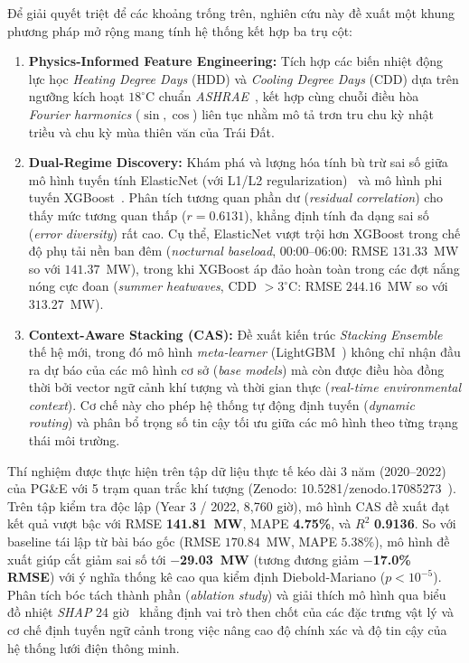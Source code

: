 Để giải quyết triệt để các khoảng trống trên, nghiên cứu này đề xuất một khung phương pháp mở rộng mang tính hệ thống kết hợp ba trụ cột:
\begin{enumerate}
    \item \textbf{Physics-Informed Feature Engineering:} Tích hợp các biến nhiệt động lực học \textit{Heating Degree Days} (HDD) và \textit{Cooling Degree Days} (CDD) dựa trên ngưỡng kích hoạt $18^\circ\text{C}$ chuẩn \textit{ASHRAE}~\cite{ashrae2021fundamentals}, kết hợp cùng chuỗi điều hòa \textit{Fourier harmonics} ($\sin, \cos$) liên tục nhằm mô tả trơn tru chu kỳ nhật triều và chu kỳ mùa thiên văn của Trái Đất.
    \item \textbf{Dual-Regime Discovery:} Khám phá và lượng hóa tính bù trừ sai số giữa mô hình tuyến tính ElasticNet (với L1/L2 regularization)~\cite{zou2005regularization} và mô hình phi tuyến XGBoost~\cite{chen2016xgboost}. Phân tích tương quan phần dư (\textit{residual correlation}) cho thấy mức tương quan thấp ($r = 0.6131$), khẳng định tính đa dạng sai số (\textit{error diversity}) rất cao. Cụ thể, ElasticNet vượt trội hơn XGBoost trong chế độ phụ tải nền ban đêm (\textit{nocturnal baseload}, 00:00--06:00: RMSE $131.33$~MW so với $141.37$~MW), trong khi XGBoost áp đảo hoàn toàn trong các đợt nắng nóng cực đoan (\textit{summer heatwaves}, CDD $> 3^\circ\text{C}$: RMSE $244.16$~MW so với $313.27$~MW).
    \item \textbf{Context-Aware Stacking (CAS):} Đề xuất kiến trúc \textit{Stacking Ensemble} thế hệ mới, trong đó mô hình \textit{meta-learner} (LightGBM~\cite{ke2017lightgbm}) không chỉ nhận đầu ra dự báo của các mô hình cơ sở (\textit{base models}) mà còn được điều hòa đồng thời bởi vector ngữ cảnh khí tượng và thời gian thực (\textit{real-time environmental context}). Cơ chế này cho phép hệ thống tự động định tuyến (\textit{dynamic routing}) và phân bổ trọng số tin cậy tối ưu giữa các mô hình theo từng trạng thái môi trường.
\end{enumerate}

Thí nghiệm được thực hiện trên tập dữ liệu thực tế kéo dài 3 năm (2020--2022) của PG\&E với 5 trạm quan trắc khí tượng (Zenodo: 10.5281/zenodo.17085273~\cite{pge2025zenodo}). Trên tập kiểm tra độc lập (Year 3 / 2022, 8,760 giờ), mô hình CAS đề xuất đạt kết quả vượt bậc với RMSE \textbf{141.81~MW}, MAPE \textbf{4.75\%}, và $R^2$ \textbf{0.9136}. So với baseline tái lập từ bài báo gốc (RMSE $170.84$~MW, MAPE $5.38\%$), mô hình đề xuất giúp cắt giảm sai số tới \textbf{$-$29.03~MW} (tương đương giảm \textbf{$-$17.0\% RMSE}) với ý nghĩa thống kê cao qua kiểm định Diebold-Mariano ($p < 10^{-5}$). Phân tích bóc tách thành phần (\textit{ablation study}) và giải thích mô hình qua biểu đồ nhiệt \textit{SHAP} 24 giờ~\cite{lundberg2017shap} khẳng định vai trò then chốt của các đặc trưng vật lý và cơ chế định tuyến ngữ cảnh trong việc nâng cao độ chính xác và độ tin cậy của hệ thống lưới điện thông minh.
